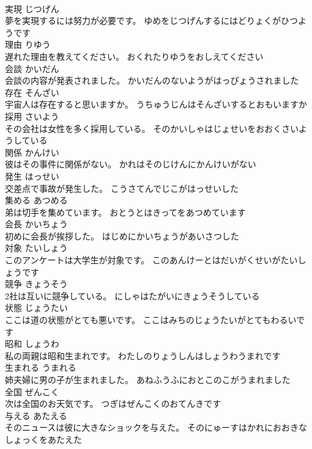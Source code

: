 \documentclass[8pt]{extreport}
\begin{document}
\begin{CJK}{UTF8}{min}
\\	実現	じつげん	
\\	夢を実現するには努力が必要です。	ゆめをじつげんするにはどりょくがひつようです	
\\	理由	りゆう	
\\	遅れた理由を教えてください。	おくれたりゆうをおしえてください	
\\	会談	かいだん	
\\	会談の内容が発表されました。	かいだんのないようがはっぴょうされました	
\\	存在	そんざい	
\\	宇宙人は存在すると思いますか。	うちゅうじんはそんざいするとおもいますか	
\\	採用	さいよう	
\\	その会社は女性を多く採用している。	そのかいしゃはじょせいをおおくさいようしている	
\\	関係	かんけい	
\\	彼はその事件に関係がない。	かれはそのじけんにかんけいがない	
\\	発生	はっせい	
\\	交差点で事故が発生した。	こうさてんでじこがはっせいした	
\\	集める	あつめる	
\\	弟は切手を集めています。	おとうとはきってをあつめています	
\\	会長	かいちょう	
\\	初めに会長が挨拶した。	はじめにかいちょうがあいさつした	
\\	対象	たいしょう	
\\	このアンケートは大学生が対象です。	このあんけーとはだいがくせいがたいしょうです	
\\	競争	きょうそう	
\\	2社は互いに競争している。	にしゃはたがいにきょうそうしている	
\\	状態	じょうたい	
\\	ここは道の状態がとても悪いです。	ここはみちのじょうたいがとてもわるいです	
\\	昭和	しょうわ	
\\	私の両親は昭和生まれです。	わたしのりょうしんはしょうわうまれです	
\\	生まれる	うまれる	
\\	姉夫婦に男の子が生まれました。	あねふうふにおとこのこがうまれました	
\\	全国	ぜんこく	
\\	次は全国のお天気です。	つぎはぜんこくのおてんきです	
\\	与える	あたえる	
\\	そのニュースは彼に大きなショックを与えた。	そのにゅーすはかれにおおきなしょっくをあたえた	

\end{CJK}
\end{document}
